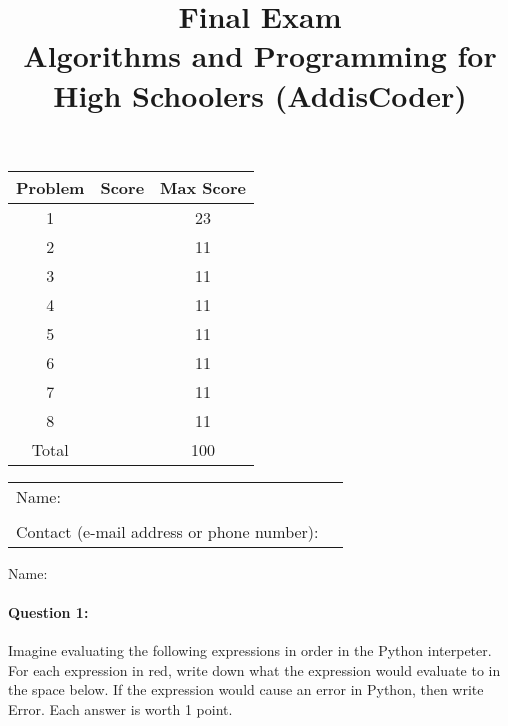\documentclass[11pt]{article}
\begin{document}
\title{Final Exam\\Algorithms and Programming for High Schoolers
  (AddisCoder)}
\date{}

\maketitle

\begin{center}
\begin{tabular}{|c|c|c|}
\hline
Problem & Score & Max Score\\
\hline
1 & & 23\\
\hline
2 & & 11\\
\hline
3 & & 11\\
\hline
4 & & 11\\
\hline
5 & & 11\\
\hline
6 & & 11\\
\hline
7 & & 11\\
\hline
8 & & 11\\
\hline
\hline
Total & & 100\\
\hline
\end{tabular}
\end{center}

\medskip

\begin{center}
\begin{tabular}{ll}
Name:\\
\\
Contact (e-mail address or phone number):
\end{tabular}
\end{center}

\newpage

\noindent Name:

\paragraph{Question 1:}
Imagine evaluating the following expressions in order in the Python
interpeter.  For each expression in red, write
down what the
expression would evaluate to in the space below.  If the expression
would cause an error in Python, then write Error.  Each answer is
worth 1 point.
\end{document}
